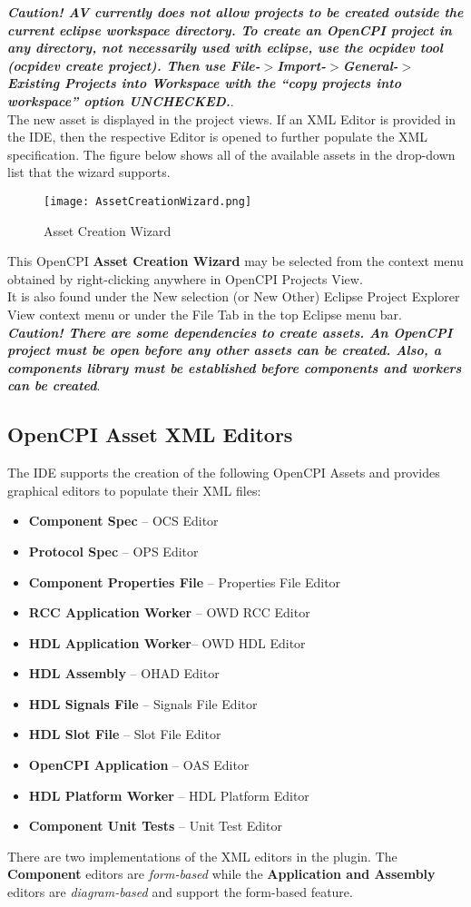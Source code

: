\documentclass[10pt, a4paper, oneside]{article}
\begin{document}
\textbf{\emph{Caution! AV currently does not allow projects to be created outside the current eclipse workspace directory. To create an OpenCPI project in any directory, not necessarily used with eclipse, use the ocpidev tool (ocpidev create project). Then use File-$>$Import-$>$General-$>$Existing Projects into Workspace with the ``copy projects into workspace'' option UNCHECKED.}}.\\

The new asset is displayed in the project views. If an XML Editor is provided in the IDE, then the respective Editor is opened to further populate the XML specification. The figure below shows all of the available assets in the drop-down list that the wizard supports.
\begin{figure}[h!]
	\centering
	\caption{Asset Creation Wizard}\label{fig:AssetCreationWizard}
	\texttt{[image: AssetCreationWizard.png]}
 \end{figure}
This OpenCPI \textbf{Asset Creation Wizard} may be selected from the context menu obtained by right-clicking anywhere in OpenCPI Projects View.\\

It is also found under the New selection (or New Other) Eclipse Project Explorer View context menu or under the File Tab in the top Eclipse menu bar.\\

\textbf{\emph{Caution! There are some dependencies to create assets. An OpenCPI project must be open before any other assets can be created. Also, a components library must be established before components and workers can be created}}.

\subsection{OpenCPI Asset XML Editors}
The IDE supports the creation of the following OpenCPI Assets and provides graphical editors to populate their XML files:
\begin{itemize}
\item \textbf{Component Spec} – OCS Editor
\item \textbf{Protocol Spec} – OPS Editor
\item \textbf{Component Properties File} – Properties File Editor
\item \textbf{RCC Application Worker} – OWD RCC Editor
\item \textbf{HDL Application Worker}– OWD HDL Editor
\item \textbf{HDL Assembly} – OHAD Editor
\item \textbf{HDL Signals File} – Signals File Editor
\item \textbf{HDL Slot File} – Slot File Editor
\item \textbf{OpenCPI Application} – OAS Editor
\item \textbf{HDL Platform Worker} – HDL Platform Editor
\item \textbf{Component Unit Tests} – Unit Test Editor
\end{itemize}
There are two implementations of the XML editors in the plugin. The \textbf{Component} editors are \emph{form-based} while the \textbf{Application and Assembly} editors are \emph{diagram-based} and support the form-based feature.
\end{document}
